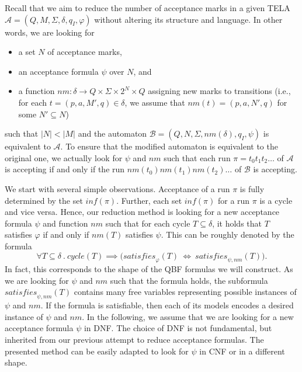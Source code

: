 \documentclass[a4paper,UKenglish,cleveref,autoref,thm-restate]{lipics-v2021}
\newcommand{\minf}{\mathit{inf}}
\newcommand{\oM}{N}
\newcommand{\rem}{\mathit{nm}}
\newcommand{\mcycle}{\mathit{cycle}}
\newcommand{\msat}{\mathit{satisfies}}
\newcommand{\mA}{\mathcal{A}}
\newcommand{\mB}{\mathcal{B}}
\begin{document}
Recall that we aim to reduce the number of acceptance marks in a given
TELA $\mA =(Q,M,\Sigma,\delta,q_I,\varphi)$ without altering its
structure and language. In other words, we are looking for
\begin{itemize}
\item a set $\oM$ of acceptance marks,
\item an acceptance formula $\psi$ over $\oM$, and 
\item a function
  $\rem:\delta\rightarrow Q \times \Sigma \times 2^{\oM}\times Q$
  assigning new marks to transitions (i.e., for each
  $t=(p,a,M',q)\in\delta$, we assume that $\rem(t)=(p,a,\oM',q)$ for
  some $\oM'\subseteq\oM$)
\end{itemize}
such that $|\oM|<|M|$ and the automaton
$\mB=(Q,\oM,\Sigma,\rem(\delta),q_I,\psi)$ is equivalent to $\mA$. To
ensure that the modified automaton is equivalent to the original one,
we actually look for $\psi$ and $\rem$ such that each run
$\pi=t_0t_1t_2\ldots$ of $\mA$ is accepting if and only if the run
$\rem(t_0)\rem(t_1)\rem(t_2)\ldots$ of $\mB$ is accepting.

We start with several simple observations. Acceptance of a run $\pi$
is fully determined by the set $\minf(\pi)$.
Further, each set $\minf(\pi)$ for a run $\pi$ is a cycle and vice
versa. Hence, our reduction method is looking for a new acceptance
formula $\psi$ and function $\rem$ such that for each cycle
$T\subseteq\delta$, it holds that $T$ satisfies $\varphi$ if and only
if $\rem(T)$ satisfies $\psi$. This can be roughly denoted by the
formula
\[
  \forall T\subseteq\delta~.~\mcycle(T)\implies\big(\msat_\varphi(T) ~\iff~ \msat_{\psi,\rem}(T)\big).
\]
In fact, this corresponds to the shape of the QBF formulas we will
construct. As we are looking for $\psi$ and $\rem$ such that the
formula holds, the subformula $\msat_{\psi,\rem}(T)$ contains many
free variables representing possible instances of $\psi$ and
$\rem$. If the formula is satisfiable, then each of its models encodes
a desired instance of $\psi$ and $\rem$. In the following, we assume
that we are looking for a new acceptance formula $\psi$ in DNF. The
choice of DNF is not fundamental, but inherited from our previous
attempt to reduce acceptance formulas. The presented method can be
easily adapted to look for $\psi$ in CNF or in a different shape.
\end{document}
